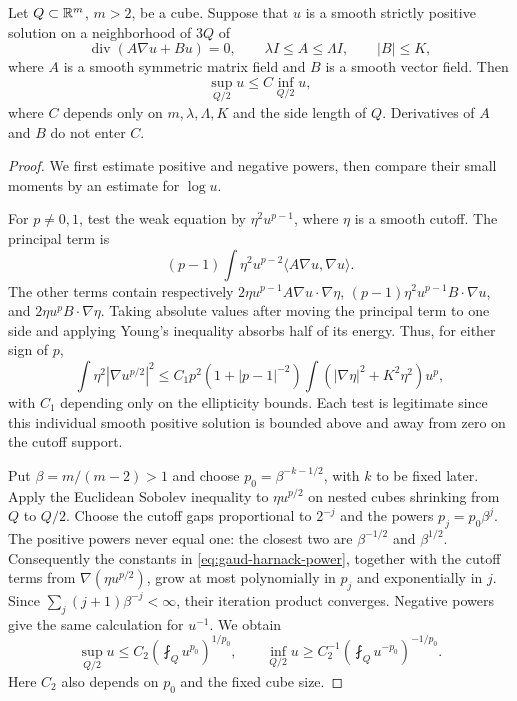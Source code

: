\begin{lemma}\label{lem:gaud-divergence-harnack}
Let $Q\subset\mathbb R^m$, $m>2$, be a cube. Suppose that $u$ is a smooth strictly positive solution on a neighborhood of $3Q$ of
\[
 \operatorname{div}(A\nabla u+Bu)=0,
 \qquad \lambda I\leq A\leq\Lambda I,\qquad |B|\leq K,
\]
where $A$ is a smooth symmetric matrix field and $B$ is a smooth vector field. Then
\[
 \sup_{Q/2}u\leq C\inf_{Q/2}u,
\]
where $C$ depends only on $m,\lambda,\Lambda,K$ and the side length of $Q$. Derivatives of $A$ and $B$ do not enter $C$.
\end{lemma}
\begin{proof}
We first estimate positive and negative powers, then compare their small moments by an estimate for $\log u$.

For $p\ne0,1$, test the weak equation by $\eta^2u^{p-1}$, where $\eta$ is a smooth cutoff. The principal term is
\[
 (p-1)\int\eta^2u^{p-2}\langle A\nabla u,\nabla u\rangle.
\]
The other terms contain respectively $2\eta u^{p-1}A\nabla u\cdot\nabla\eta$, $(p-1)\eta^2u^{p-1}B\cdot\nabla u$, and $2\eta u^pB\cdot\nabla\eta$. Taking absolute values after moving the principal term to one side and applying Young's inequality absorbs half of its energy. Thus, for either sign of $p$,
\begin{equation}\label{eq:gaud-harnack-power}
 \int\eta^2|\nabla u^{p/2}|^2
 \leq C_1p^2(1+|p-1|^{-2})
        \int (|\nabla\eta|^2+K^2\eta^2)u^p,
\end{equation}
with $C_1$ depending only on the ellipticity bounds. Each test is legitimate since this individual smooth positive solution is bounded above and away from zero on the cutoff support.

Put $\beta=m/(m-2)>1$ and choose $p_0=\beta^{-k-1/2}$, with $k$ to be fixed later. Apply the Euclidean Sobolev inequality to $\eta u^{p/2}$ on nested cubes shrinking from $Q$ to $Q/2$. Choose the cutoff gaps proportional to $2^{-j}$ and the powers $p_j=p_0\beta^j$. The positive powers never equal one: the closest two are $\beta^{-1/2}$ and $\beta^{1/2}$. Consequently the constants in \eqref{eq:gaud-harnack-power}, together with the cutoff terms from $\nabla(\eta u^{p/2})$, grow at most polynomially in $p_j$ and exponentially in $j$. Since $\sum_j(j+1)\beta^{-j}<\infty$, their iteration product converges. Negative powers give the same calculation for $u^{-1}$. We obtain
\begin{equation}\label{eq:gaud-harnack-moments}
 \sup_{Q/2}u\leq C_2\left(\fint_Q u^{p_0}\right)^{1/p_0},
 \qquad
 \inf_{Q/2}u\geq C_2^{-1}
                  \left(\fint_Q u^{-p_0}\right)^{-1/p_0}.
\end{equation}
Here $C_2$ also depends on $p_0$ and the fixed cube size.


\end{proof}
